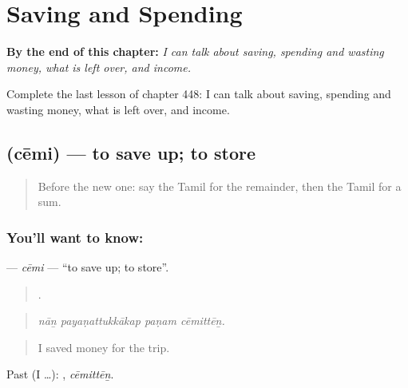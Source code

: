 
\chapter{Saving and Spending}
\label{ch:ta-saving-and-spending}

\begin{chapteropening}
\textbf{By the end of this chapter:} \emph{I can talk about saving, spending and wasting money, what is left over, and income.}

Complete the last lesson of chapter 448: I can talk about saving, spending and wasting money, what is left over, and income.
\end{chapteropening}

\section[\texorpdfstring{\ta{சேமி} (cēmi)}{சேமி (cēmi)}]{ (cēmi) — to save up; to store}

\label{lesson:TA-C448-cemi}



\begin{quote}
Before the new one: say the Tamil for the remainder, then the Tamil for a sum.
\end{quote}

\subsection*{You'll want to know: }
\textbf{} — \emph{cēmi} — \textquotedblleft{}to save up; to store\textquotedblright{}.

\begin{quote}
   .
\end{quote}

\begin{quote}
\emph{nāṉ payaṇattukkākap paṇam cēmittēṉ.}
\end{quote}

\begin{quote}
I saved money for the trip.
\end{quote}

Past (I …): , \emph{cēmittēṉ}.

